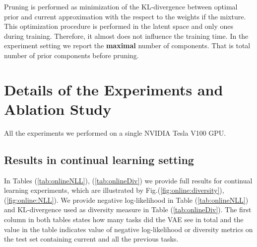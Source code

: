 Pruning is performed as minimization of the KL-divergence between optimal prior and current approximation with the respect to the weights if the mixture. This optimization procedure is performed in the latent space and only ones during training. Therefore, it almost does not influence the training time. 
In the experiment setting we report the \textbf{maximal} number of components. That is total number of prior components before pruning.

\newpage
\section{Details of the Experiments and Ablation Study}\label{app:expdetails}
All the experiments we performed on a single NVIDIA Tesla V100 GPU.

\subsection{Results in continual learning setting}\label{app:incr}
In Tables (\ref{tab:onlineNLL}), (\ref{tab:onlineDiv}) we provide full results for continual learning experiments, which are illustrated by Fig.(\ref{fig:online:diversity}),(\ref{fig:online:NLL}). We provide negative log-likelihood in Table (\ref{tab:onlineNLL}) and KL-divergence used as diversity measure in Table (\ref{tab:onlineDiv}). The first column in both tables states how many tasks did the VAE see in total and the value in the table indicates value of negative log-likelihood or diversity metrics on the test set containing current and all the previous tasks.

